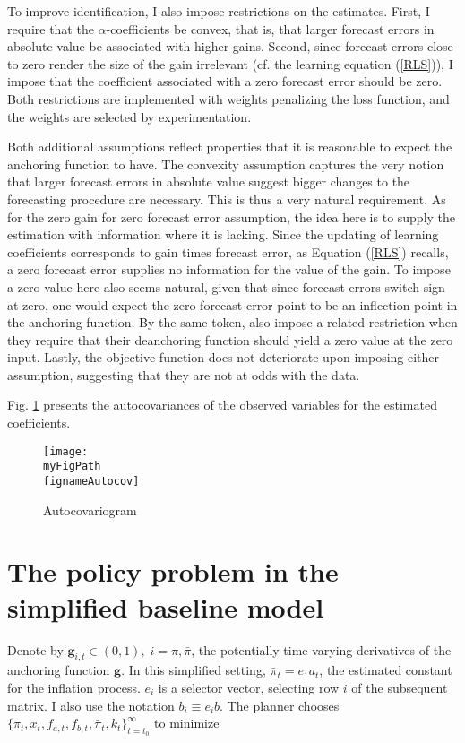 \documentclass[11pt]{article}
\def \myFigPath {../../figures/}
\renewcommand{\[}{\begin{equation}}
\renewcommand{\]}{\end{equation}}
\def\fignameAutocov{command_GMM_LOMgain_univariate_autocovariogram_nfe_7_loss_273_gridspacing_uneven_Wdiffs2_10000_Wmid_1000_16_Jul_2020}
\begin{document}
To improve identification, I also impose restrictions on the estimates. First, I require that the $\alpha$-coefficients be convex, that is, that larger forecast errors in absolute value be associated with higher gains. Second, since forecast errors close to zero render the size of the gain irrelevant (cf. the learning equation (\ref{RLS})), I impose that the coefficient associated with a zero forecast error should be zero. Both restrictions are implemented with weights penalizing the loss function, and the weights are selected by experimentation. 

Both additional assumptions reflect properties that it is reasonable to expect the anchoring function to have. The convexity assumption captures the very notion that larger forecast errors in absolute value suggest bigger changes to the forecasting procedure are necessary. This is thus a very natural requirement. As for the zero gain for zero forecast error assumption, the idea here is to supply the estimation with information where it is lacking. Since the updating of learning coefficients corresponds to gain times forecast error, as Equation (\ref{RLS}) recalls, a zero forecast error supplies no information for the value of the gain. To impose a zero value here also seems natural, given that since forecast errors switch sign at zero, one would expect the zero forecast error point to be an inflection point in the anchoring function. By the same token, \cite{gobbi2019monetary} also impose a related restriction when they require that their deanchoring function should yield a zero value at the zero input. Lastly, the objective function does not deteriorate upon imposing either assumption, suggesting that they are not at odds with the data.

Fig. \ref{autocovariogram} presents the autocovariances of the observed variables for the estimated coefficients. 


\begin{figure}[h!]
\texttt{[image: \\myFigPath \\fignameAutocov]}
\caption{Autocovariogram}
\label{autocovariogram}
\end{figure}

\section{The policy problem in the simplified baseline model }\label{app_midsimple_problem}
Denote by $\mathbf{g}_{i,t} \in (0,1), \; i=\pi, \bar{\pi}$, the potentially time-varying derivatives of the anchoring function $\mathbf{g}$. In this simplified setting, $\bar{\pi}_t = e_1 a_t$, the estimated constant for the inflation process. $e_i$ is a selector vector, selecting row $i$ of the subsequent matrix. I also use the notation $b_i \equiv e_i b$.   The planner chooses $\{\pi_t, x_t, f_{a,t},  f_{b,t}, \bar{\pi}_t, k_t\}_{t=t_0}^{\infty}$ to minimize
\end{document}
